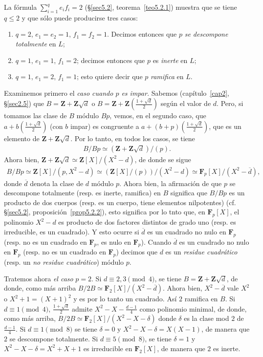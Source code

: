 \documentclass[bibtotoc,leqno,spanish]{amsbook}
\newcommand{\ZZ}{\mathbf{Z}}
\newcommand{\FF}{\mathbf{F}}
\newcommand{\oline}[1]{\overline{#1}}
\numberwithin{equation}{section}
\theoremstyle{note}
\theoremstyle{note}
\theoremstyle{rem}
\numberwithin{theorem}{section}
\numberwithin{proposition}{section}
\numberwithin{definition}{section}
\numberwithin{lemma}{section}
\numberwithin{corollary}{section}
\numberwithin{example}{section}
\numberwithin{footnote}{section}%
\begin{document}
La f\'ormula $\sum_{i=1}^{q}e_{i}f_{i}=2$ (\S\ref{sec5.2}, teorema~\ref{teo5.2.1}) muestra que se tiene $q\leq 2$ y que
s\'olo puede producirse tres casos:
\begin{enumerate}
\item $q=2$, $e_{1}=e_{2}=1$, $f_{1}=f_{2}=1$. Decimos entonces que $p$ {\em se descompone totalmente}
en $L$;
\item $q=1$, $e_{1}=1$, $f_{1}=2$; decimos entonces que $p$ es {\em inerte} en $L$;
\item $q=1$, $e_{1}=2$, $f_{1}=1$; esto quiere decir que $p$ {\em ramifica} en $L$.
\end{enumerate}
Examinemos primero el {\em caso cuando $p$ es impar.} Sabemos (cap\'itulo~\ref{cap2}, \S\ref{sec2.5}) que
$B = \ZZ+\ZZ\sqrt{d}$ o $B = \ZZ+\ZZ\left(\frac{1+\sqrt{d}}{2}\right)$ seg\'un el valor de $d$. Pero,
si tomamos las clase de $B$ m\'odulo $Bp$, vemos, en el segundo caso, que $a+b\left(\frac{1+\sqrt{d}}{2}\right)$
(con $b$ impar) es congruente a $a+(b+p)\left(\frac{1+\sqrt{d}}{2}\right)$, que es un elemento de
$\ZZ+\ZZ\sqrt{d}$. Por lo tanto, en todos los casos, se tiene
\begin{gather*}
B/Bp\simeq(\ZZ+\ZZ\sqrt{d})/(p).
\end{gather*}
Ahora bien, $\ZZ+\ZZ\sqrt{d}\simeq\ZZ[X]/(X^{2}-d)$, de donde se sigue
\begin{gather*}
B/Bp\simeq\ZZ[X]/(p,X^{2}-d)\simeq(\ZZ[X]/(p))/(X^{2}-d)\simeq\FF_{p}[X]/(X^{2}-\oline d),
\end{gather*}
donde $\oline d$ denota la clase de $d$ m\'odulo $p$. Ahora bien, la afirmaci\'on de que $p$ se
descompone totalmente (resp. es inerte, ramifica) en $B$ significa que $B/Bp$ es un producto de dos cuerpos
(resp. es un cuerpo, tiene elementos nilpotentes) (cf. \S\ref{sec5.2}, proposici\'on~\ref{prop5.2.2}), esto significa por lo tnto que,
en $\FF_{p}[X]$, el polinomio $X^{2}-d$ es producto de dos factores distintos de grado uno (resp.
es irreducible, es un cuadrado). Y esto ocurre si $\oline d$ es un cuadrado no nulo en $\FF_{p}$
(resp. no es un cuadrado en $\FF_{p}$, es nulo en $\FF_{p}$). Cuando $\oline d$ es un cuadrado no nulo
en $\FF_{p}$ (resp. no es un cuadrado en $\FF_{p}$) decimos que $d$ es un {\em residue cuadr\'atico}
(resp. un {\em no residue cuadr\'atico}) m\'odulo $p$.

Tratemos ahora {\em el caso} $p=2$. Si $d\equiv 2, 3\pmod 4$, se tiene $B=\ZZ+\ZZ\sqrt{d}$, de donde,
como m\'as arriba $B/2B\simeq\FF_{2}[X]/(X^{2}-\oline d)$. Ahora bien, $X^{2}-\oline d$ vale $X^{2}$
o $X^{2}+1 = (X+1)^{2}$ y es por lo tanto un cuadrado. As\'i $2$ ramifica en $B$. Si $d\equiv 1\pmod 4$,
$\frac{1+\sqrt{d}}{2}$ admite $X^{2}-X-\frac{d-1}{4}$ como polinomio minimal, de donde, como m\'as arriba,
$B/2B\simeq\FF_{2}[X]/(X^{2}-X-\delta)$ donde $\delta$ es la clase mod $2$ de $\frac{d-1}{4}$. Si
$d\equiv 1\pmod 8$ se tiene $\delta=0$ y $X^{2}-X-\delta=X(X-1)$, de manera que $2$ se descompone
totalmente. Si $d\equiv 5\pmod 8$, se tiene $\delta=1$ y $X^{2}-X-\delta=X^{2}+X+1$ es irreducible en
$\FF_{2}[X]$, de manera que $2$ es inerte.
\end{document}
